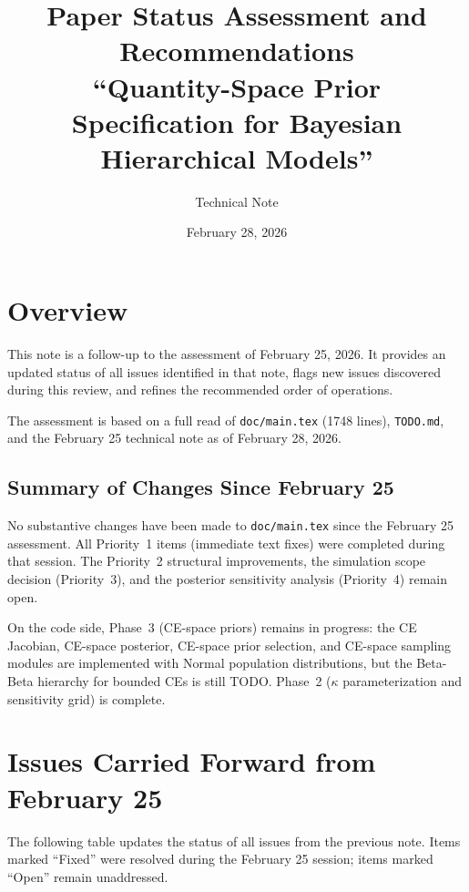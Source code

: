 \documentclass[12pt,a4paper]{article}
\title{Paper Status Assessment and Recommendations\\[6pt]
\large ``Quantity-Space Prior Specification for Bayesian Hierarchical Models''}
\author{Technical Note}
\date{February 28, 2026}
\begin{document}
\maketitle

\section{Overview}

This note is a follow-up to the assessment of February 25, 2026. It provides
an updated status of all issues identified in that note, flags new issues
discovered during this review, and refines the recommended order of operations.

The assessment is based on a full read of \texttt{doc/main.tex} (1748 lines),
\texttt{TODO.md}, and the February 25 technical note as of February 28, 2026.

\subsection{Summary of Changes Since February 25}

No substantive changes have been made to \texttt{doc/main.tex} since the
February 25 assessment. All Priority~1 items (immediate text fixes) were
completed during that session. The Priority~2 structural improvements,
the simulation scope decision (Priority~3), and the posterior sensitivity
analysis (Priority~4) remain open.

On the code side, Phase~3 (CE-space priors) remains in progress: the CE
Jacobian, CE-space posterior, CE-space prior selection, and CE-space sampling
modules are implemented with Normal population distributions, but the
Beta-Beta hierarchy for bounded CEs is still TODO. Phase~2 ($\kappa$
parameterization and sensitivity grid) is complete.


\section{Issues Carried Forward from February 25}

The following table updates the status of all issues from the previous note.
Items marked ``Fixed'' were resolved during the February 25 session; items
marked ``Open'' remain unaddressed.
\end{document}

